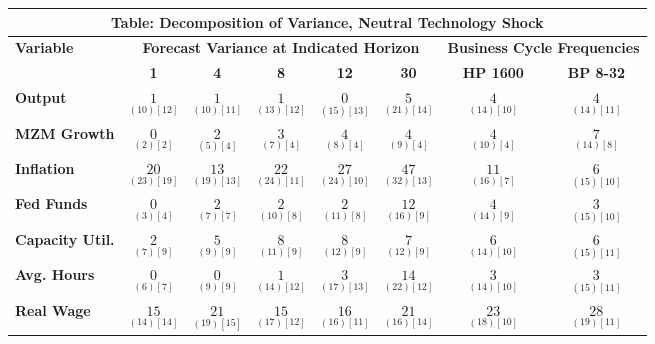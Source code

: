 \documentclass{article}
\begin{document}
 \begin{tabular}{|l|c|@{}c|c|@{}c|c|@{}c|c|} 
 \hline 
 \multicolumn{8}{|c|}{\textbf{Table: Decomposition of Variance, Neutral Technology Shock}} \\ \hline 
 \textbf{Variable} & \multicolumn{5}{|c}{\textbf{Forecast Variance at 
 Indicated Horizon}} & \multicolumn{2}{|c|}{\textbf{Business Cycle 
 Frequencies}} \\ \cline{2-8} 
 & \textbf{1} & \textbf{4} & \textbf{8} & \textbf{12} & \textbf{30} & \textbf{%
 HP 1600} & \textbf{BP 8-32} \\ \hline\hline 
 \textbf{Output} & $\underset{( 10) [ 12]}{  1}$ & $\underset{( 10) [ 11]}{  1}$ & $\underset{( 13) [ 12]}{  1}$ & $\underset{( 15) [ 13]}{  0}$ & $\underset{( 21) [ 14]}{  5}$ & $\underset{( 14) [ 10]}{  4}$ & $\underset{( 14) [ 11]}{  4}$ \\ \hline 
 \textbf{MZM Growth} & $\underset{(  2) [  2]}{  0}$ & $\underset{(  5) [  4]}{  2}$ & $\underset{(  7) [  4]}{  3}$ & $\underset{(  8) [  4]}{  4}$ & $\underset{(  9) [  4]}{  4}$ & $\underset{( 10) [  4]}{  4}$ & $\underset{( 14) [  8]}{  7}$ \\ \hline 
 \textbf{Inflation} & $\underset{( 23) [ 19]}{ 20}$ & $\underset{( 19) [ 13]}{ 13}$ & $\underset{( 24) [ 11]}{ 22}$ & $\underset{( 24) [ 10]}{ 27}$ & $\underset{( 32) [ 13]}{ 47}$ & $\underset{( 16) [  7]}{ 11}$ & $\underset{( 15) [ 10]}{  6}$ \\ \hline 
 \textbf{Fed Funds} & $\underset{(  3) [  4]}{  0}$ & $\underset{(  7) [  7]}{  2}$ & $\underset{( 10) [  8]}{  2}$ & $\underset{( 11) [  8]}{  2}$ & $\underset{( 16) [  9]}{ 12}$ & $\underset{( 14) [  9]}{  4}$ & $\underset{( 15) [ 10]}{  3}$ \\ \hline 
 \textbf{Capacity Util.} & $\underset{(  7) [  9]}{  2}$ & $\underset{(  9) [  9]}{  5}$ & $\underset{( 11) [  9]}{  8}$ & $\underset{( 12) [  9]}{  8}$ & $\underset{( 12) [  9]}{  7}$ & $\underset{( 14) [ 10]}{  6}$ & $\underset{( 15) [ 11]}{  6}$ \\ \hline 
 \textbf{Avg. Hours} & $\underset{(  6) [  7]}{  0}$ & $\underset{(  9) [  9]}{  0}$ & $\underset{( 14) [ 12]}{  1}$ & $\underset{( 17) [ 13]}{  3}$ & $\underset{( 22) [ 12]}{ 14}$ & $\underset{( 14) [ 10]}{  3}$ & $\underset{( 15) [ 11]}{  3}$ \\ \hline 
 \textbf{Real Wage} &  $\underset{( 14) [ 14]}{ 15}$ & $\underset{( 19) [ 15]}{ 21}$ & $\underset{( 17) [ 12]}{ 15}$ & $\underset{( 16) [ 11]}{ 16}$ & $\underset{( 16) [ 14]}{ 21}$ & $\underset{( 18) [ 10]}{ 23}$ & $\underset{( 19) [ 11]}{ 28}$ \\ \hline 

\end{tabular}
\end{document}
